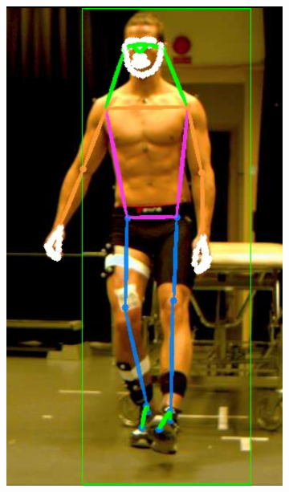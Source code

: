 {\begin{figure}[h]
\begin{subfigure}[t]{0.22\textwidth}
    \includegraphics[height=1.3\textwidth]{files/figs/res/hpe/36-4.png}
    \caption{}
  \end{subfigure}


\end{figure}}
